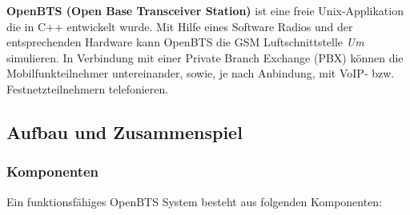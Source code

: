 \label{sec:openbts}
\textbf{OpenBTS (Open Base Transceiver Station)} ist eine freie Unix-Applikation die in C++ entwickelt wurde. Mit Hilfe eines Software Radios und der entsprechenden Hardware kann OpenBTS die GSM Luftschnittstelle \textit{Um} simulieren. In Verbindung mit einer Private Branch Exchange (PBX) können die Mobilfunkteilnehmer untereinander, sowie, je nach Anbindung, mit VoIP- bzw. Festnetzteilnehmern telefonieren.

\subsection{Aufbau und Zusammenspiel}
\subsubsection{Komponenten}
Ein funktionsfähiges OpenBTS System besteht aus folgenden Komponenten:

